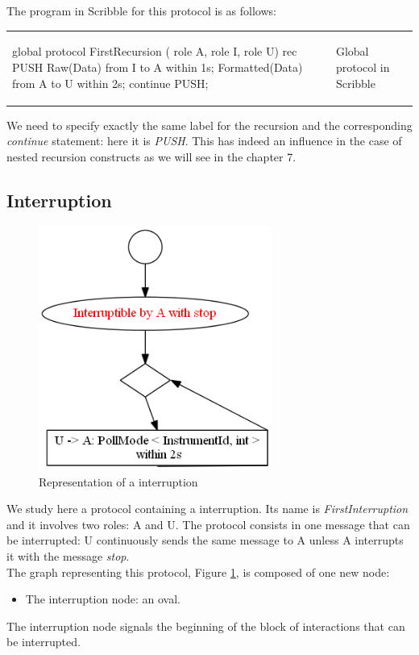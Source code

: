 \documentclass[a4paper,11pt,twoside]{report}
\begin{document}
The program in Scribble for this protocol is as follows:
\begin{center}
\begin{tabular}{ll}
\begin{SJLISTING}
global protocol FirstRecursion ( role A, role I, role U) {
	rec PUSH {
		Raw(Data) from I to A within 1s;
 		Formatted(Data) from A to U within 2s;
           	continue PUSH;
		}
}
\end{SJLISTING}
& Global protocol in Scribble\\
\end{tabular}
\end{center}
We need to specify exactly the same label for the recursion and the corresponding \emph{continue} statement: here it is \emph{PUSH}. This has indeed an influence in the case of nested recursion constructs as we will see in the chapter 7.

\subsection{Interruption}
\begin{figure}[h]
\begin{center}
\includegraphics[height=8cm]{TestInterrupt}\caption{Representation of a interruption}
\label{fig:Interrupt}
\end{center}
\end{figure}
We study here a protocol containing a interruption. Its name is \emph{FirstInterruption} and it involves two roles: A and U. The protocol consists in one message that can be interrupted: U continuously sends the same message to A unless A interrupts it with the message \emph{stop}.\\
The graph representing this protocol, Figure \ref{fig:Interrupt}, is composed of one new node:
\begin{itemize}
\item The interruption node: an oval.
\end{itemize}
The interruption node signals the beginning of the block of interactions that can be interrupted. 
\end{document}
